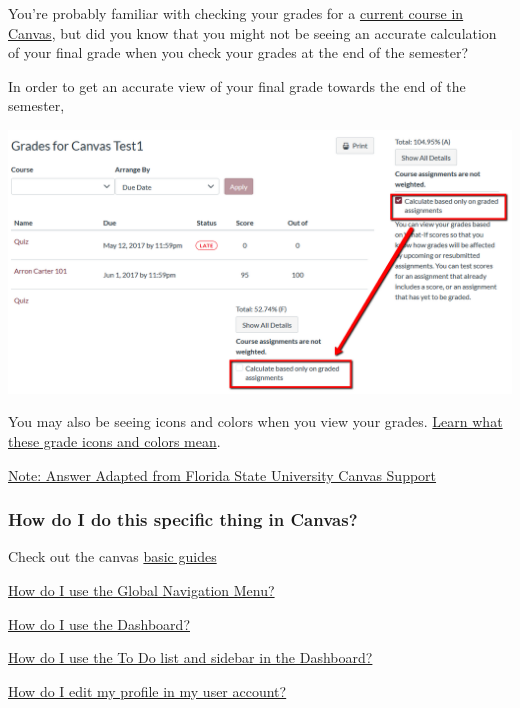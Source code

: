 You're probably familiar with checking your grades for a \href{https://community.canvaslms.com/t5/Student-Guide/How-do-I-view-my-grades-in-a-current-course/ta-p/493}{current course in Canvas}, but did you know that you might not be seeing an accurate calculation of your final grade when you check your grades at the end of the semester?

In order to get an accurate view of your final grade towards the end of the semester,

\begin{center}\includegraphics[width=0.5\linewidth]{img/grades} \end{center}

You may also be seeing icons and colors when you view your grades. \href{https://community.canvaslms.com/docs/DOC-16533-4212829283}{Learn what these grade icons and colors mean}.

\href{https://support.canvas.fsu.edu/kb/article/1068-students-make-sure-you-are-seeing-the-right-grades-in-canvas/}{Note: Answer Adapted from Florida State University Canvas Support}

\hypertarget{how-do-i-do-this-specific-thing-in-canvas}{%
\subsubsection{How do I do this specific thing in Canvas?}\label{how-do-i-do-this-specific-thing-in-canvas}}

Check out the canvas \href{https://community.canvaslms.com/t5/Canvas-Basics-Guide/tkb-p/basics}{basic guides}

\href{https://community.canvaslms.com/docs/DOC-10603-4212710332}{How do I use the Global Navigation Menu?}

\href{https://community.canvaslms.com/docs/DOC-10587-4212710330}{How do I use the Dashboard?}

\href{https://community.canvaslms.com/docs/DOC-10589-4212717407}{How do I use the To Do list and sidebar in the Dashboard?}

\href{https://community.canvaslms.com/docs/DOC-10628-4212710342}{How do I edit my profile in my user account?}

